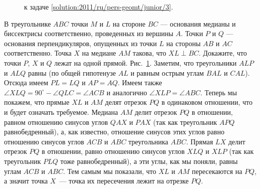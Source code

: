 \ifsolution
\begin{figure}\centering
    \caption{к задаче \ref{solution:2011/ru/pers-geomt/junior/3}.}
    \label{fig:solution:2011/ru/pers-geomt/junior/3}
\end{figure}
\fi %

\problem
В треугольнике $ABC$ точки $M$ и $L$ на стороне $BC$ --- основания медианы и
биссектрисы соответственно, проведенных из вершины $A$.
Точки $P$ и $Q$ --- основания перпендикуляров, опущенных из точки $L$ на
стороны $AB$ и $AC$ соответственно.
Точка $X$ на медиане $AM$ такова, что $XL \perp BC$.
Докажите, что точки $P$, $X$ и $Q$ лежат на одной прямой. 
\solution
\label{solution:2011/ru/pers-geomt/junior/3}%
Рис.~\ref{fig:solution:2011/ru/pers-geomt/junior/3}.
Заметим, что треугольники $ALP$ и $ALQ$ равны
(по общей гипотенузе $AL$ и равным острым углам $BAL$ и $CAL$).
Отсюда имеем $PL = LQ$ и $AP = AQ$.
Имеем также
$\angle XLQ = 90^\circ - \angle QLC = \angle ACB$
и аналогично $\angle XLP = \angle ABC$.
Теперь мы покажем, что прямые $XL$ и $AM$ делят отрезок $PQ$ в одинаковом
отношении, что и будет означать требуемое.
Медиана $AM$ делит отрезок $PQ$ в отношении, равном отношению синусов углов
$QAX$ и $PAX$ (так как треугольник $APQ$ равнобедренный), а, как известно,
отношение синусов этих углов равно отношению синусов углов $ACB$ и $ABC$
треугольника $ABC$.
Прямая $LX$ делит отрезок $PQ$ в отношении, равно отношению синусов углов $XLQ$
и $XLP$ (так как треугольник $PLQ$ тоже равнобедренный), а эти углы, как мы
поняли, равны углам $ACB$ и $ABC$.
Тем самым мы показали, что $XL$ и $AM$ пересекаются на $PQ$, а значит точка
$X$~--- точка их пересечения лежит на отрезке $PQ$.
\endproblem
